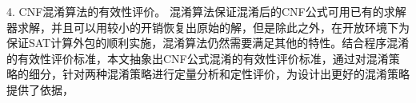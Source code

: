 4. CNF混淆算法的有效性评价。
混淆算法保证混淆后的CNF公式可用已有的求解器求解，并且可以用较小的开销恢复出原始的解，但是除此之外，在开放环境下为保证SAT计算外包的顺利实施，混淆算法仍然需要满足其他的特性。结合程序混淆的有效性评价标准，本文抽象出CNF公式混淆的有效性评价标准，通过对混淆策略的细分，针对两种混淆策略进行定量分析和定性评价，为设计出更好的混淆策略提供了依据，

%
%
%
%

